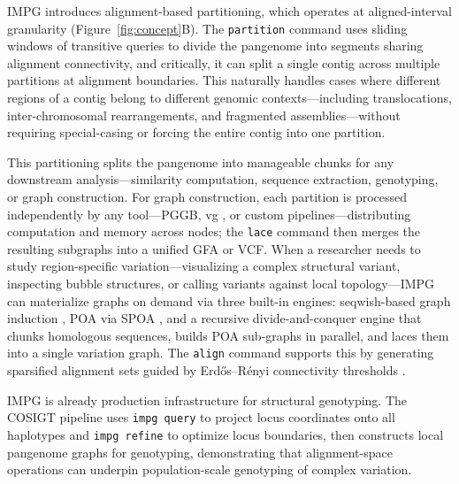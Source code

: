 IMPG introduces alignment-based partitioning, which operates at aligned-interval granularity (Figure~\ref{fig:concept}B). The \texttt{partition} command uses sliding windows of transitive queries to divide the pangenome into segments sharing alignment connectivity, and critically, it can split a single contig across multiple partitions at alignment boundaries. This naturally handles cases where different regions of a contig belong to different genomic contexts---including translocations, inter-chromosomal rearrangements, and fragmented assemblies---without requiring special-casing or forcing the entire contig into one partition.

This partitioning splits the pangenome into manageable chunks for any downstream analysis---similarity computation, sequence extraction, genotyping, or graph construction. For graph construction, each partition is processed independently by any tool---PGGB, vg \cite{Garrison2018}, or custom pipelines---distributing computation and memory across nodes; the \texttt{lace} command then merges the resulting subgraphs into a unified GFA or VCF. When a researcher needs to study region-specific variation---visualizing a complex structural variant, inspecting bubble structures, or calling variants against local topology---IMPG can materialize graphs on demand via three built-in engines: seqwish-based graph induction \cite{sweepga, garrison2023seqwish}, POA via SPOA \cite{Vaser2017}, and a recursive divide-and-conquer engine that chunks homologous sequences, builds POA sub-graphs in parallel, and laces them into a single variation graph. The \texttt{align} command supports this by generating sparsified alignment sets guided by Erd\H{o}s--R\'enyi connectivity thresholds \cite{erdos1959random}.

IMPG is already production infrastructure for structural genotyping. The COSIGT pipeline \cite{bolognini2026cosigt} uses \texttt{impg query} to project locus coordinates onto all haplotypes and \texttt{impg refine} to optimize locus boundaries, then constructs local pangenome graphs for genotyping, demonstrating that alignment-space operations can underpin population-scale genotyping of complex variation.
